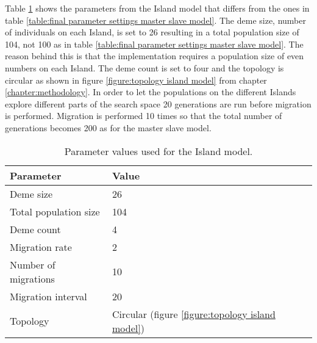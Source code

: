 \noindent Table \ref{table:final parameter settings island model} shows the parameters from the Island model that differs from the ones in table \ref{table:final parameter settings master slave model}. The deme size, number of individuals on each Island, is set to 26 resulting in a total population size of 104, not 100 as in table \ref{table:final parameter settings master slave model}. The reason behind this is that the implementation requires a population size of even numbers on each Island. The deme count is set to four and the topology is circular as shown in figure \ref{figure:topology island model} from chapter \ref{chapter:methodology}. In order to let the populations on the different Islands explore different parts of the search space 20 generations are run before migration is performed. Migration is performed 10 times so that the total number of generations becomes 200 as for the master slave model. \\


\begin{table}[h!]
\centering
\caption{Parameter values used for the Island model.}
\label{table:final parameter settings island model}
\begin{tabular}{l|l}
\textbf{Parameter} & \textbf{Value} \\ 
\hline 
Deme size & 26 \\
Total population size & 104 \\  
Deme count & 4 \\
Migration rate & 2 \\
Number of migrations & 10 \\ 
Migration interval & 20 \\
Topology & Circular (figure \ref{figure:topology island model}) \\
\end{tabular}
\end{table}


